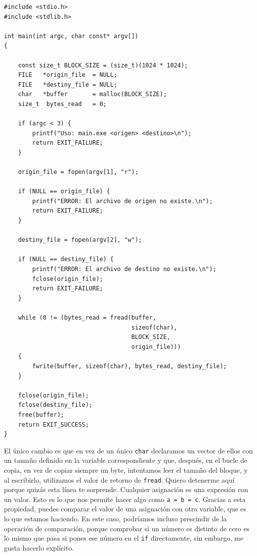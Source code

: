 \documentclass[a4paper]{article}
\begin{document}
\noindent
\begin{minipage}[H]{\linewidth}
\mbox{}
\begin{lstlisting}[style=C,
caption={Ejemplo de lectura de fichero con \textit{buffer}},
label={lst:readWithBuffer}]
#include <stdio.h>
#include <stdlib.h>

int main(int argc, char const* argv[])
{

    const size_t BLOCK_SIZE = (size_t)(1024 * 1024);
    FILE   *origin_file  = NULL;
    FILE   *destiny_file = NULL;
    char   *buffer       = malloc(BLOCK_SIZE);
    size_t  bytes_read   = 0;

    if (argc < 3) {
        printf("Uso: main.exe <origen> <destino>\n");
        return EXIT_FAILURE;
    }

    origin_file = fopen(argv[1], "r");

    if (NULL == origin_file) {
        printf("ERROR: El archivo de origen no existe.\n");
        return EXIT_FAILURE;
    }

    destiny_file = fopen(argv[2], "w");

    if (NULL == destiny_file) {
        printf("ERROR: El archivo de destino no existe.\n");
        fclose(origin_file);
        return EXIT_FAILURE;
    }

    while (0 != (bytes_read = fread(buffer,
                                    sizeof(char),
                                    BLOCK_SIZE,
                                    origin_file)))
    {
        fwrite(buffer, sizeof(char), bytes_read, destiny_file);
    }

    fclose(origin_file);
    fclose(destiny_file);
    free(buffer);
    return EXIT_SUCCESS;
}
\end{lstlisting}
\end{minipage}

El único cambio es que en vez de un único \verb!char! declaramos un vector de
ellos con un tamaño definido en la variable correspondiente y que, después,
en el bucle de copia, en vez de copiar siempre un byte, intentamos leer
el tamaño del bloque, y al escribirlo, utilizamos el valor de retorno de
\verb!fread!. Quiero detenerme aquí porque quizás esta línea te sorprende.
Cualquier asignación es una expresión con un valor. Esto es lo que nos permite
hacer algo como \verb!a = b = c!. Gracias a esta propiedad, puedes comparar
el valor de una asignación con otra variable, que es lo que estamos haciendo.
En este caso, podríamos incluso prescindir de la operación de comparación,
porque comprobar si un número es distinto de cero es lo mismo que pasa si pones
ese número en el \verb!if! directamente, sin embargo, me gusta hacerlo
explícito.
\end{document}
